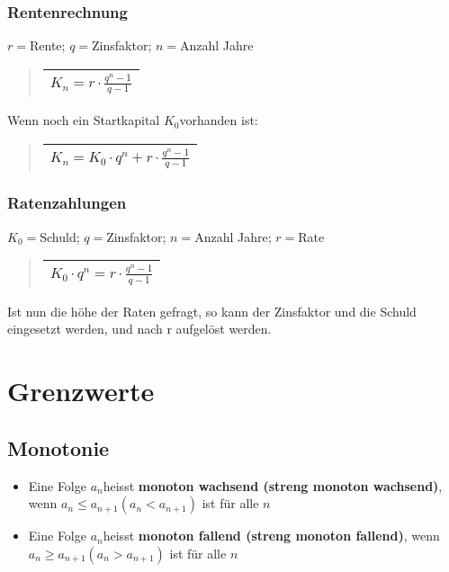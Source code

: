 \subsubsection*{Rentenrechnung}

$r=$Rente; $q=$Zinsfaktor; $n=$Anzahl Jahre
\begin{verse}
\begin{tabular}{|c|}
\hline 
$K_{n}=r\cdot\frac{q^{n}-1}{q-1}$\tabularnewline
\hline 
\end{tabular}
\end{verse}
Wenn noch ein Startkapital $K_{0}$vorhanden ist:
\begin{verse}
\begin{tabular}{|c|}
\hline 
$K_{n}=K_{0}\cdot q^{n}+r\cdot\frac{q^{n}-1}{q-1}$\tabularnewline
\hline 
\end{tabular}
\end{verse}

\subsubsection*{Ratenzahlungen}

$K_{0}=$Schuld; $q=$Zinsfaktor; $n=$Anzahl Jahre; $r=$Rate
\begin{verse}
\begin{tabular}{|c|}
\hline 
$K_{0}\cdot q^{n}=r\cdot\frac{q^{n}-1}{q-1}$\tabularnewline
\hline 
\end{tabular}
\end{verse}
Ist nun die höhe der Raten gefragt, so kann der Zinsfaktor und die
Schuld eingesetzt werden, und nach r aufgelöst werden.


\section*{Grenzwerte}


\subsection*{Monotonie}
\begin{itemize}
\item Eine Folge $a_{n}$heisst \textbf{monoton wachsend (streng monoton
wachsend)}, wenn $a_{n}\leq a_{n+1}(a_{n}<a_{n+1})$ ist für alle
$n$
\item Eine Folge $a_{n}$heisst \textbf{monoton fallend (streng monoton
fallend)}, wenn $a_{n}\geq a_{n+1}(a_{n}>a_{n+1})$ ist für alle $n$
\end{itemize}

